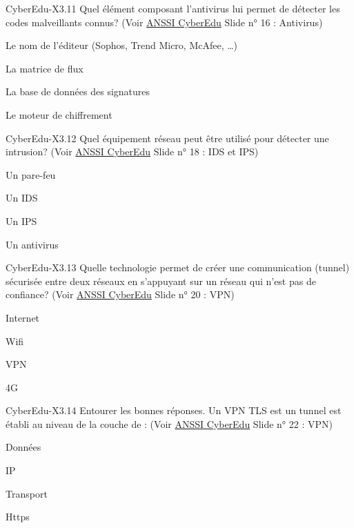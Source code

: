 \begin{multi}[multiple=true]{CyberEdu-X3.11}
	Quel élément composant l'antivirus lui permet de détecter les codes malveillants connus?  (Voir \href{https://www.ssi.gouv.fr/administration/formations/cyberedu/contenu-pedagogique-cyberedu/}{ANSSI CyberEdu} Slide n° 16 : Antivirus)
\item Le nom de l'éditeur (Sophos, Trend Micro, McAfee, …)
\item La matrice de flux
\item* La base de données des signatures
\item Le moteur de chiffrement
\end{multi}
\begin{multi}[multiple=true]{CyberEdu-X3.12}
	Quel équipement réseau peut être utilisé pour détecter une intrusion? (Voir \href{https://www.ssi.gouv.fr/administration/formations/cyberedu/contenu-pedagogique-cyberedu/}{ANSSI CyberEdu} Slide n° 18 : IDS et IPS)
\item Un pare-feu
\item* Un IDS
\item Un IPS
\item Un antivirus
\end{multi}
\begin{multi}[multiple=true]{CyberEdu-X3.13}
	Quelle technologie permet de créer une communication (tunnel) sécurisée entre deux réseaux en s'appuyant sur un réseau qui n'est pas de confiance? (Voir \href{https://www.ssi.gouv.fr/administration/formations/cyberedu/contenu-pedagogique-cyberedu/}{ANSSI CyberEdu} Slide n° 20 : VPN)
\item Internet
\item Wifi
\item* VPN
\item 4G
\end{multi}
\begin{multi}[multiple=true]{CyberEdu-X3.14}
	Entourer les bonnes réponses.  Un VPN TLS est un tunnel est établi au niveau de la couche de  : (Voir \href{https://www.ssi.gouv.fr/administration/formations/cyberedu/contenu-pedagogique-cyberedu/}{ANSSI CyberEdu} Slide n° 22 : VPN)
\item Données
\item IP
\item* Transport
\item Https
\end{multi}
